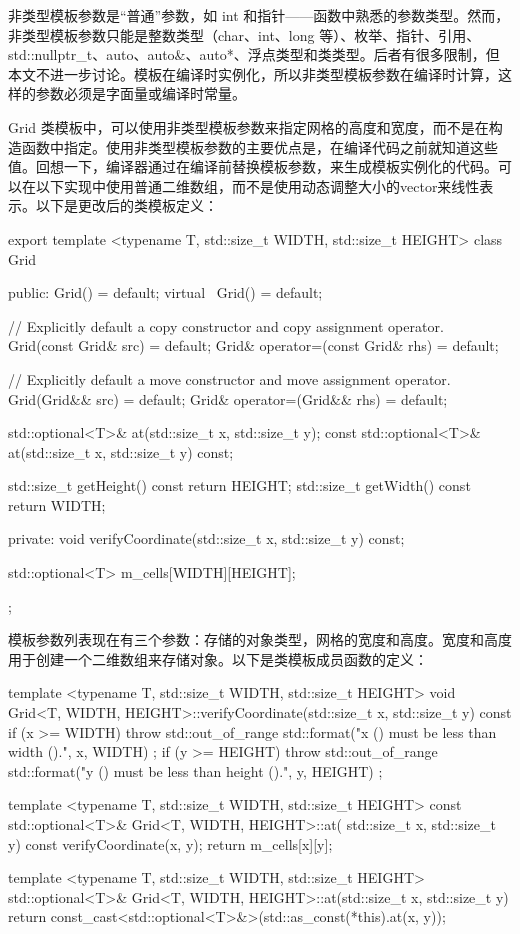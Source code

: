 
非类型模板参数是“普通”参数，如 int 和指针——函数中熟悉的参数类型。然而，非类型模板参数只能是整数类型（char、int、long 等）、枚举、指针、引用、std::nullptr\_t、auto、auto\&、auto*、浮点类型和类类型。后者有很多限制，但本文不进一步讨论。模板在编译时实例化，所以非类型模板参数在编译时计算，这样的参数必须是字面量或编译时常量。

Grid 类模板中，可以使用非类型模板参数来指定网格的高度和宽度，而不是在构造函数中指定。使用非类型模板参数的主要优点是，在编译代码之前就知道这些值。回想一下，编译器通过在编译前替换模板参数，来生成模板实例化的代码。可以在以下实现中使用普通二维数组，而不是使用动态调整大小的vector来线性表示。以下是更改后的类模板定义：

\begin{cpp}
export template <typename T, std::size_t WIDTH, std::size_t HEIGHT>
class Grid
{
    public:
        Grid() = default;
        virtual ~Grid() = default;

        // Explicitly default a copy constructor and copy assignment operator.
        Grid(const Grid& src) = default;
        Grid& operator=(const Grid& rhs) = default;

        // Explicitly default a move constructor and move assignment operator.
        Grid(Grid&& src) = default;
        Grid& operator=(Grid&& rhs) = default;

        std::optional<T>& at(std::size_t x, std::size_t y);
        const std::optional<T>& at(std::size_t x, std::size_t y) const;

        std::size_t getHeight() const { return HEIGHT; }
        std::size_t getWidth() const { return WIDTH; }

    private:
        void verifyCoordinate(std::size_t x, std::size_t y) const;

        std::optional<T> m_cells[WIDTH][HEIGHT];
};
\end{cpp}

模板参数列表现在有三个参数：存储的对象类型，网格的宽度和高度。宽度和高度用于创建一个二维数组来存储对象。以下是类模板成员函数的定义：

\begin{cpp}
template <typename T, std::size_t WIDTH, std::size_t HEIGHT>
void Grid<T, WIDTH, HEIGHT>::verifyCoordinate(std::size_t x, std::size_t y) const
{
    if (x >= WIDTH) {
        throw std::out_of_range {
            std::format("x ({}) must be less than width ({}).", x, WIDTH) };
    }
    if (y >= HEIGHT) {
        throw std::out_of_range {
            std::format("y ({}) must be less than height ({}).", y, HEIGHT) };
    }
}

template <typename T, std::size_t WIDTH, std::size_t HEIGHT>
const std::optional<T>& Grid<T, WIDTH, HEIGHT>::at(
    std::size_t x, std::size_t y) const
{
    verifyCoordinate(x, y);
    return m_cells[x][y];
}

template <typename T, std::size_t WIDTH, std::size_t HEIGHT>
std::optional<T>& Grid<T, WIDTH, HEIGHT>::at(std::size_t x, std::size_t y)
{
    return const_cast<std::optional<T>&>(std::as_const(*this).at(x, y));
}
\end{cpp}

